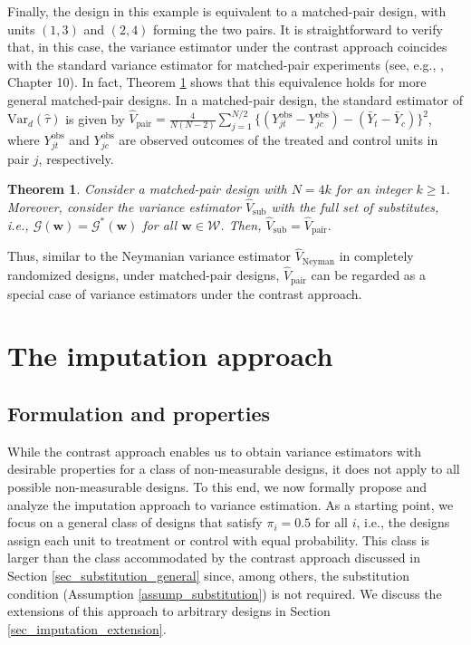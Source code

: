 \documentclass[12pt]{article}
\newcommand{\Var}{{\text{Var}}}
\newtheorem{theorem}{Theorem}[section]
\begin{document}
Finally, the design in this example is equivalent to a matched-pair design, with units $(1,3)$ and $(2,4)$ forming the two pairs. It is straightforward to verify that, in this case, the variance estimator under the contrast approach coincides with the standard variance estimator for matched-pair experiments (see, e.g., \citealt{imbens2015causal}, Chapter 10). In fact, Theorem \ref{thm_substitute_matched} shows that this equivalence holds for more general matched-pair designs. In a matched-pair design, the standard estimator of $\Var_d(\hat{\tau})$ is given by  $\hat{V}_{\text{pair}} = \frac{4}{N(N-2)}\sum_{j=1}^{N/2}\{(Y^{\text{obs}}_{jt}-Y^{\text{obs}}_{jc})- (\bar{Y}_t - \bar{Y}_c)\}^2$, where $Y^{\text{obs}}_{jt}$ and $Y^{\text{obs}}_{jc}$ are observed outcomes of the treated and control units in pair $j$, respectively.
\begin{theorem} \normalfont
Consider a matched-pair design with $N = 4k$ for an integer $k\geq 1$. Moreover, consider the variance estimator $\hat{V}_{\text{sub}}$ with the full set of substitutes, i.e., $\mathcal{G}(\bm{w}) = \mathcal{G}^*(\bm{w})$ for all $\bm{w} \in \mathcal{W}$. Then, $\hat{V}_{\text{sub}} = \hat{V}_{\text{pair}}.$ 
\label{thm_substitute_matched}
\end{theorem}
Thus, similar to the Neymanian variance estimator $\hat{V}_{\text{Neyman}}$ in completely randomized designs, under matched-pair designs, $\hat{V}_{\text{pair}}$ can be regarded as a special case of variance estimators under the contrast approach.




\section{The imputation approach}
\label{sec_imputation}

\subsection{Formulation and properties}
\label{sec_imputation_general}
While the contrast approach enables us to obtain variance estimators with desirable properties for a class of non-measurable designs, it does not apply to all possible non-measurable designs. To this end, we now formally propose and analyze the imputation approach to variance estimation. As a starting point, we focus on a general class of designs that satisfy $\pi_i = 0.5$ for all $i$, i.e., the designs assign each unit to treatment or control with equal probability. This class is larger than the class accommodated by the contrast approach discussed in Section \ref{sec_substitution_general} since, among others, the substitution condition (Assumption \ref{assump_substitution}) is not required. We discuss the extensions of this approach to arbitrary designs in Section \ref{sec_imputation_extension}.
\end{document}

